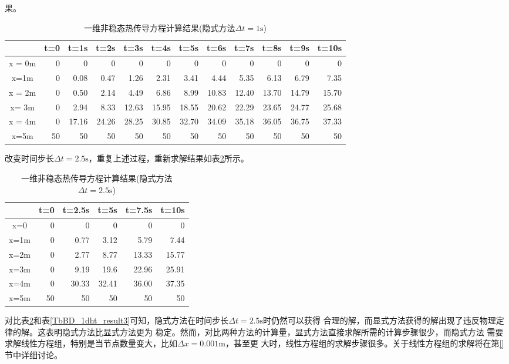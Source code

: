 果。
\begin{table}[h!]
  \begin{center}
    \caption{一维非稳态热传导方程计算结果(隐式方法$\Delta t=1\mathrm{s}$)}
  \label{TbBD_1dht_result4}
  \begin{tabular}{|c|r|r|r|r|r|r|r|r|r|r|r|}
    \hline
 & t=0 & t=1s & t=2s & t=3s & t=4s & t=5s & t=6s & t=7s & t=8s & t=9s & t=10s
 \\
  \hline
    x = 0m & 0& 0& 0& 0& 0& 0& 0& 0& 0& 0& 0
 \\
  \hline
    x=1m & 0 & 0.08 & 0.47 & 1.26 & 2.31 & 3.41 & 4.44 & 5.35 & 6.13 & 6.79 & 7.35
 \\
  \hline
    x = 2m & 0 & 0.50 & 2.14 & 4.49 & 6.86 & 8.99 & 10.83 & 12.40 & 13.70 & 14.79 & 15.70
 \\
  \hline
    x= 3m & 0 &2.94 & 8.33 & 12.63 & 15.95 & 18.55 & 20.62 & 22.29 & 23.65 & 24.77 & 25.68
 \\
  \hline
    x = 4m & 0 & 17.16 & 24.26 & 28.25 & 30.85 & 32.70 & 34.09 & 35.18 & 36.05 &
    36.75 & 37.33
 \\
  \hline
    x=5m &   50 & 50 & 50 &50 &50 &50 &50 &50 &50 &50 & 50
\\
    \hline
  \end{tabular}
  \end{center}
\end{table}

改变时间步长$\Delta t=2.5\mathrm{s}$，重复上述过程，重新求解结果如表\ref{TbBD_1dht_result5}所示。
\begin{table}[h!]
  \begin{center}
    \caption{一维非稳态热传导方程计算结果(隐式方法$\Delta t=2.5\mathrm{s}$)}
  \label{TbBD_1dht_result5}
  \begin{tabular}{|c|r|r|r|r|r|}
    \hline
 & t=0 & t=2.5s & t=5s & t=7.5s & t=10s
 \\
  \hline
x=0 & 0 & 0 & 0 & 0 & 0
\\
\hline
x=1m & 0 & 0.77  & 3.12  & 5.79  & 7.44
\\
\hline
x=2m & 0 & 2.77  & 8.77  & 13.33 & 15.77
\\
\hline
x=3m & 0 & 9.19  & 19.6 & 22.96  & 25.91
\\
\hline
x=4m & 0 & 30.33  & 32.41  & 36.00  & 37.35
\\
\hline
x=5m & 50 & 50 & 50 & 50 & 50 
\\
    \hline
  \end{tabular}
  \end{center}
\end{table}
对比表\ref{TbBD_1dht_result5}和表\ref{TbBD_1dht_result3}可知，隐式方法在时间步长$\Delta t=2.5\mathrm{s}$时仍然可以获得
合理的解，而显式方法获得的解出现了违反物理定律的解。这表明隐式方法比显式方法更为
稳定。然而，对比两种方法的计算量，显式方法直接求解所需的计算步骤很少，而隐式方法
需要求解线性方程组，特别是当节点数量变大，比如$\Delta x=0.001\mathrm{m}$，甚至更
大时，线性方程组的求解步骤很多。关于线性方程组的求解将在第\ref{}节中详细讨论。



